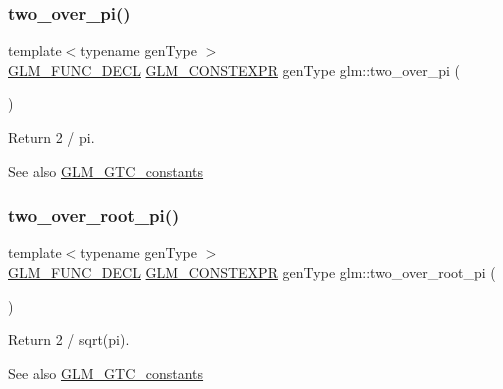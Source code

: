\subsubsection{\texorpdfstring{two\+\_\+over\+\_\+pi()}{two\_over\_pi()}}
{\footnotesize\ttfamily template$<$typename gen\+Type $>$ \\
\mbox{\hyperlink{setup_8hpp_ab2d052de21a70539923e9bcbf6e83a51}{G\+L\+M\+\_\+\+F\+U\+N\+C\+\_\+\+D\+E\+CL}} \mbox{\hyperlink{setup_8hpp_a08b807947b47031d3a511f03f89645ad}{G\+L\+M\+\_\+\+C\+O\+N\+S\+T\+E\+X\+PR}} gen\+Type glm\+::two\+\_\+over\+\_\+pi (\begin{DoxyParamCaption}{ }\end{DoxyParamCaption})}

Return 2 / pi. \begin{DoxySeeAlso}{See also}
\mbox{\hyperlink{group__gtc__constants}{G\+L\+M\+\_\+\+G\+T\+C\+\_\+constants}} 
\end{DoxySeeAlso}
\mbox{\label{group__gtc__constants_ga5827301817640843cf02026a8d493894}} 
\subsubsection{\texorpdfstring{two\+\_\+over\+\_\+root\+\_\+pi()}{two\_over\_root\_pi()}}
{\footnotesize\ttfamily template$<$typename gen\+Type $>$ \\
\mbox{\hyperlink{setup_8hpp_ab2d052de21a70539923e9bcbf6e83a51}{G\+L\+M\+\_\+\+F\+U\+N\+C\+\_\+\+D\+E\+CL}} \mbox{\hyperlink{setup_8hpp_a08b807947b47031d3a511f03f89645ad}{G\+L\+M\+\_\+\+C\+O\+N\+S\+T\+E\+X\+PR}} gen\+Type glm\+::two\+\_\+over\+\_\+root\+\_\+pi (\begin{DoxyParamCaption}{ }\end{DoxyParamCaption})}

Return 2 / sqrt(pi). \begin{DoxySeeAlso}{See also}
\mbox{\hyperlink{group__gtc__constants}{G\+L\+M\+\_\+\+G\+T\+C\+\_\+constants}} 
\end{DoxySeeAlso}
\mbox{\label{group__gtc__constants_gaa5276a4617566abcfe49286f40e3a256}} 

